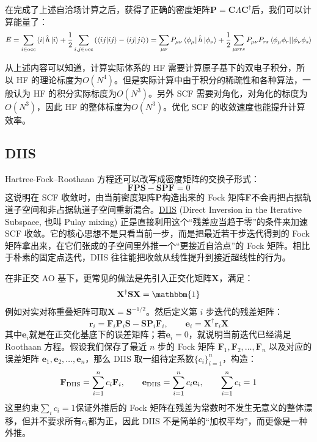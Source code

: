 在完成了上述自洽场计算之后，获得了正确的密度矩阵$\mathbf{P}=\mathbf{C}\Lambda\mathbf{C}^{\dagger}$后，我们可以计算能量了：
\[E=\sum_{i\in\rm{occ}}\bra{i}\hat{h}\ket{i}+\frac{1}{2}\sum_{i,j\in\rm{occ}}\left(\bra{ij}\ket{ij}-\bra{ij}\ket{ji}\right)=\sum_{\mu\nu}P_{\mu\nu}\bra{\phi_{\mu}}\hat{h}\ket{\phi_{\nu}}+\frac{1}{2}\sum_{\mu\nu rs}P_{\mu\nu}P_{rs}\bra{\phi_{\mu}\phi_r}\ket{|\phi_{\nu}\phi_s}\]

从上述内容可以知道，计算实际体系的 HF 需要计算原子基下的双电子积分，所以 HF 的理论标度为$O(N^4)$。但是实际计算中由于积分的稀疏性和各种算法，一般认为 HF 的积分实际标度为$O(N^3)$。另外 SCF 需要对角化，对角化的标度为$O(N^3)$，因此 HF 的整体标度为$O(N^3)$。优化 SCF 的收敛速度也能提升计算效率。

\subsection{DIIS}
Hartree-Fock--Roothaan 方程还可以改写成密度矩阵的交换子形式：
\[\mathbf{F}\mathbf{P}\mathbf{S}-\mathbf{S}\mathbf{P}\mathbf{F}=0\]
这说明在 SCF 收敛时，由当前密度矩阵$\mathbf{P}$构造出来的 Fock 矩阵$\mathbf{F}$不会再把占据轨道子空间和非占据轨道子空间重新混合。\href{https://vergil.chemistry.gatech.edu/static/content/diis.pdf}{DIIS} (Direct Inversion in the Iterative Subspace, 也叫 Pulay mixing) 正是直接利用这个“残差应当趋于零”的条件来加速 SCF 收敛。它的核心思想不是只看当前一步，而是把最近若干步迭代得到的 Fock 矩阵拿出来，在它们张成的子空间里外推一个“更接近自洽点”的 Fock 矩阵。相比于朴素的固定点迭代，DIIS 往往能把收敛从线性提升到接近超线性的行为。

在非正交 AO 基下，更常见的做法是先引入正交化矩阵$\mathbf{X}$，满足：
\[\mathbf{X}^{\dagger}\mathbf{S}\mathbf{X}=\mathbbm{1}\]
例如对实对称重叠矩阵可取$\mathbf{X}=\mathbf{S}^{-1/2}$。然后定义第 $i$ 步迭代的残差矩阵：
\[\mathbf{r}_i=\mathbf{F}_i\mathbf{P}_i\mathbf{S}-\mathbf{S}\mathbf{P}_i\mathbf{F}_i,\qquad \mathbf{e}_i=\mathbf{X}^{\dagger}\mathbf{r}_i\mathbf{X}\]
其中$\mathbf{e}_i$就是在正交化基底下的误差矩阵；若$\mathbf{e}_i=0$，就说明当前迭代已经满足 Roothaan 方程。假设我们保存了最近 $n$ 步的 Fock 矩阵 $\mathbf{F}_1,\mathbf{F}_2,\ldots,\mathbf{F}_n$ 以及对应的误差矩阵 $\mathbf{e}_1,\mathbf{e}_2,\ldots,\mathbf{e}_n$，那么 DIIS 取一组待定系数$\{c_i\}_{i=1}^{n}$，构造：
\[\mathbf{F}_{\rm DIIS}=\sum_{i=1}^{n}c_i\mathbf{F}_i,\qquad \mathbf{e}_{\rm DIIS}=\sum_{i=1}^{n}c_i\mathbf{e}_i,\qquad \sum_{i=1}^{n}c_i=1\]
这里约束$\sum_i c_i=1$保证外推后的 Fock 矩阵在残差为常数时不发生无意义的整体漂移，但并不要求所有$c_i$都为正，因此 DIIS 不是简单的“加权平均”，而更像是一种外推。

